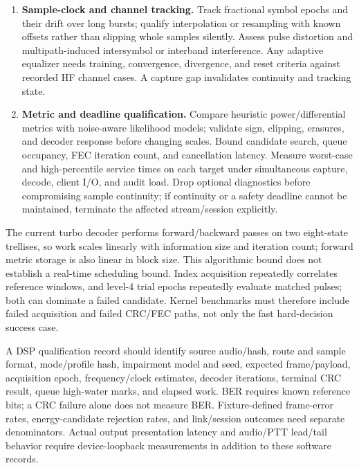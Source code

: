 \begin{enumerate}[leftmargin=1.6em]
        This is a proposed pilot estimator, not a performance result. At
        $H=512$ its phase observation repeats every 93.75 Hz, requiring coarse
        branch selection and outlier/low-energy rejection. Fading and channel
        variation must be included in qualification before closing a loop.
  \item \textbf{Sample-clock and channel tracking.} Track fractional symbol
        epochs and their drift over long bursts; qualify interpolation or
        resampling with known offsets rather than slipping whole samples
        silently. Assess pulse distortion and multipath-induced intersymbol
        or interband interference. Any adaptive equalizer needs training,
        convergence, divergence, and reset criteria against recorded HF
        channel cases. A capture gap invalidates continuity and tracking state.
  \item \textbf{Metric and deadline qualification.} Compare heuristic
        power/differential metrics with noise-aware likelihood models; validate
        sign, clipping, erasures, and decoder response before changing scales.
        Bound candidate search, queue occupancy, FEC iteration count, and
        cancellation latency. Measure worst-case and high-percentile service
        times on each target under simultaneous capture, decode, client I/O,
        and audit load. Drop optional diagnostics before compromising sample
        continuity; if continuity or a safety deadline cannot be maintained,
        terminate the affected stream/session explicitly.
\end{enumerate}

The current turbo decoder performs forward/backward passes on two eight-state
trellises, so work scales linearly with information size and iteration count;
forward metric storage is also linear in block size. This algorithmic bound
does not establish a real-time scheduling bound. Index acquisition repeatedly
correlates reference windows, and level-4 trial epochs repeatedly evaluate
matched pulses; both can dominate a failed candidate. Kernel benchmarks must
therefore include failed acquisition and failed CRC/FEC paths, not only the
fast hard-decision success case.

A DSP qualification record should identify source audio/hash, route and sample
format, mode/profile hash, impairment model and seed, expected frame/payload,
acquisition epoch, frequency/clock estimates, decoder iterations, terminal
CRC result, queue high-water marks, and elapsed work. BER requires known
reference bits; a CRC failure alone does not measure BER. Fixture-defined
frame-error rates, energy-candidate rejection rates, and link/session outcomes
need separate denominators. Actual output presentation latency and audio/PTT
lead/tail behavior require device-loopback measurements in addition to these
software records.

